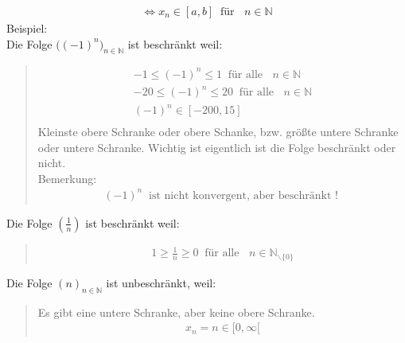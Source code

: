 \begin{align*}
\Leftrightarrow x_n\in [a,b]\;\;\text{für }\;\; n\in \mathbb{N}
\end{align*}
Beispiel:\\
\textbullet \;\; Die Folge $ \big((-1)^n\big)_{n\in\mathbb{N}} $ ist beschränkt weil:\\
\begin{quote}
	\begin{align*}
	-1\leq(-1)^n\leq 1\;\;\text{für alle }\;\; n\in\mathbb{N}\\
	-20\leq(-1)^n\leq 20\;\;\text{für alle }\;\; n\in\mathbb{N}\\
	(-1)^n \in [-200,15]\\
	\end{align*}
	Kleinste obere Schranke oder obere Schanke, bzw. größte untere Schranke oder untere Schranke. Wichtig ist eigentlich ist die Folge beschränkt oder nicht.\\
	Bemerkung:\\
	\begin{align*}
	(-1)^n \;\;\text{ist nicht konvergent, aber beschränkt ! }
	\end{align*}
\end{quote}
\textbullet \;\;Die Folge $ (\frac{1}{n}) $ ist beschränkt weil:\\
\begin{quote}
	\begin{align*}
	1\geq \frac{1}{n}\geq 0 \;\;\text{für alle }\;\;n\in\mathbb{N}_{\backslash\{0\}}
	\end{align*}
\end{quote}
\textbullet \;\; Die Folge $ (n)_{n\in\mathbb{N}} $ ist unbeschränkt, weil:\\
\begin{quote}
	Es gibt eine untere Schranke, aber keine obere Schranke.\\
	\begin{align*}
	x_n=n\in[0,\infty[
	\end{align*}
\end{quote}
